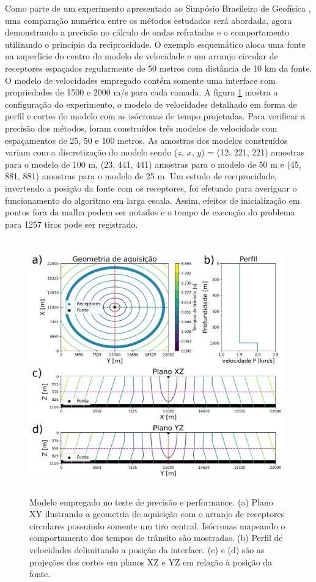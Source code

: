 Como parte de um experimento apresentado ao Simpósio Brasileiro de Geofísica \cite{alves2022refraction}, uma comparação numérica entre os métodos estudados será abordada, agora demonstrando a precisão no cálculo de ondas refratadas e o comportamento utilizando o princípio da reciprocidade. O exemplo esquemático aloca uma fonte na superfície do centro do modelo de velocidade e um arranjo circular de receptores espaçados regularmente de 50 metros com distância de 10 km da fonte. O modelo de velocidades empregado contém somente uma interface com propriedades de 1500 e 2000 m/s para cada camada. A figura \ref{fig:configurationNumericalComparison} mostra a configuração do experimento, o modelo de velocidades detalhado em forma de perfil e cortes do modelo com as isócronas de tempo projetadas. Para verificar a precisão dos métodos, foram construídos três modelos de velocidade com espaçamentos de 25, 50 e 100 metros. As amostras dos modelos construídos variam com a discretização do modelo sendo ($z$, $x$, $y$) = (12, 221, 221) amostras para o modelo de 100 m, (23, 441, 441) amostras para o modelo de 50 m e (45, 881, 881) amostras para o modelo de 25 m. Um estudo de reciprocidade, invertendo a posição da fonte com os receptores, foi efetuado para averiguar o funcionamento do algoritmo em larga escala. Assim, efeitos de inicialização em pontos fora da malha podem ser notados e o tempo de execução do problema para 1257 tiros pode ser registrado.

\begin{figure}[H]
	\centering
	\includegraphics[width = 11cm, height = 11cm]{Imgs/RevisaoBibliografica/modelGeometry.png}
	\caption{Modelo empregado no teste de precisão e performance. (a) Plano XY ilustrando a geometria de aquisição com o arranjo de receptores circulares possuindo somente um tiro central. Isócronas mapeando o comportamento dos tempos de trânsito são mostradas. (b) Perfil de velocidades delimitando a posição da interface. (c) e (d) são as projeções dos cortes em planos XZ e YZ em relação à posição da fonte.}
	\label{fig:configurationNumericalComparison}
\end{figure}

